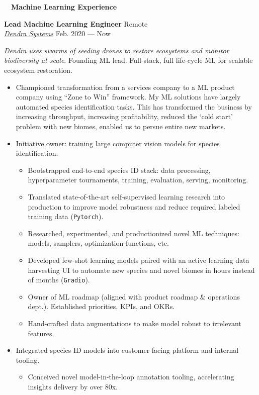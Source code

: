 \documentclass[a4paper,12pt]{article}
\newcommand{\resheading}[1]{{\hspace{-9pt} \colorbox{mygrey}{\begin{minipage}{\textwidth}{\textmd{~~\large \textbf{#1} \vphantom{p\^{E}}}}\end{minipage}}\vspace{6pt}} }
\newcommand{\ressubheading}[4]{{\begin{minipage}{\textwidth}
                                    \textbf{#1} \hfill #2 \\
                                    \textit{#3} \hfill #4 \\
\end{minipage}}}
\begin{document}
    \resheading{Machine Learning Experience}


    \ressubheading{Lead Machine Learning Engineer}{Remote}{\href{dendra.io}{Dendra Systems}}{Feb. 2020 --- Now}

    \vspace{-6pt} \textit{Dendra uses swarms of seeding drones to restore ecosystems and monitor biodiversity at scale}. Founding ML lead. Full-stack, full life-cycle ML for scalable ecosystem restoration.
    \begin{itemize}
        \item Championed transformation from a services company to a ML product company using ``Zone to Win'' framework. My ML solutions have largely automated species identification tasks. This has transformed the business by increasing throughput, increasing profitability, reduced the `cold start' problem with new biomes, enabled us to persue entire new markets.
        \item Initiative owner: training large computer vision models for species identification.
        \begin{itemize}
            \item Bootstrapped end-to-end species ID stack: data processing, hyperparameter tournaments, training, evaluation, serving, monitoring.
            \item Translated state-of-the-art self-supervised learning research into production to improve model robustness and reduce required labeled training data (\texttt{Pytorch}).
            \item Researched, experimented, and productionized novel ML techniques: models, samplers, optimization functions, etc.
            \item Developed few-shot learning models paired with an active learning data harvesting UI to automate new species and novel biomes in hours instead of months (\texttt{Gradio}).
            \item Owner of ML roadmap (aligned with product roadmap \& operations dept.). Established priorities, KPIs, and OKRs.
            \item Hand-crafted data augmentations to make model robust to irrelevant features.
        \end{itemize}
        \item Integrated species ID models into customer-facing platform and internal tooling.
        \begin{itemize}
            \item Conceived novel model-in-the-loop annotation tooling, accelerating insights delivery by over 80x.

\end{itemize}
\end{itemize}
\end{document}
